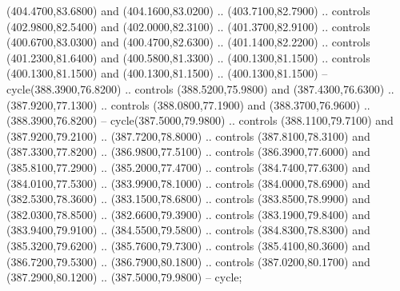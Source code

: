 {\begin{scope}[y=0.80pt, x=0.80pt, yscale=-1, xscale=1, inner sep=0pt, outer sep=0pt, #1]
      (404.4700,83.6800) and (404.1600,83.0200) .. (403.7100,82.7900) .. controls
      (402.9800,82.5400) and (402.0000,82.3100) .. (401.3700,82.9100) .. controls
      (400.6700,83.0300) and (400.4700,82.6300) .. (401.1400,82.2200) .. controls
      (401.2300,81.6400) and (400.5800,81.3300) .. (400.1300,81.1500) .. controls
      (400.1300,81.1500) and (400.1300,81.1500) .. (400.1300,81.1500) --
      cycle(388.3900,76.8200) .. controls (388.5200,75.9800) and (387.4300,76.6300)
      .. (387.9200,77.1300) .. controls (388.0800,77.1900) and (388.3700,76.9600) ..
      (388.3900,76.8200) -- cycle(387.5000,79.9800) .. controls (388.1100,79.7100)
      and (387.9200,79.2100) .. (387.7200,78.8000) .. controls (387.8100,78.3100)
      and (387.3300,77.8200) .. (386.9800,77.5100) .. controls (386.3900,77.6000)
      and (385.8100,77.2900) .. (385.2000,77.4700) .. controls (384.7400,77.6300)
      and (384.0100,77.5300) .. (383.9900,78.1000) .. controls (384.0000,78.6900)
      and (382.5300,78.3600) .. (383.1500,78.6800) .. controls (383.8500,78.9900)
      and (382.0300,78.8500) .. (382.6600,79.3900) .. controls (383.1900,79.8400)
      and (383.9400,79.9100) .. (384.5500,79.5800) .. controls (384.8300,78.8300)
      and (385.3200,79.6200) .. (385.7600,79.7300) .. controls (385.4100,80.3600)
      and (386.7200,79.5300) .. (386.7900,80.1800) .. controls (387.0200,80.1700)
      and (387.2900,80.1200) .. (387.5000,79.9800) -- cycle;


\end{scope}}
